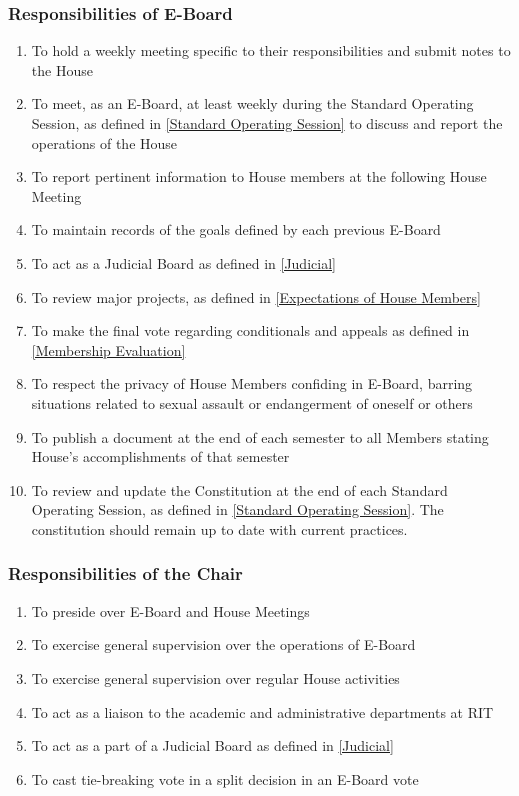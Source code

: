 \documentclass{article}
\newcommand{\asubsection}[1]{\subsubsection{#1} \label{#1}}
\begin{document}
\asubsection{Responsibilities of E-Board}
\begin{enumerate}
	\item To hold a weekly meeting specific to their responsibilities and submit notes to the House
	\item To meet, as an E-Board, at least weekly during the Standard Operating Session, as defined in \ref{Standard Operating Session} to discuss and report the operations of the House
	\item To report pertinent information to House members at the following House Meeting
	\item To maintain records of the goals defined by each previous E-Board
	\item To act as a Judicial Board as defined in \ref{Judicial}
	\item To review major projects, as defined in \ref{Expectations of House Members}
	\item To make the final vote regarding conditionals and appeals as defined in \ref{Membership Evaluation}
	\item To respect the privacy of House Members confiding in E-Board, barring situations related to sexual assault or endangerment of oneself or others
	\item To publish a document at the end of each semester to all Members stating House’s accomplishments of that semester
	\item To review and update the Constitution at the end of each Standard Operating Session, as defined in \ref{Standard Operating Session}.
		The constitution should remain up to date with current practices.
\end{enumerate}

\asubsection{Responsibilities of the Chair}
\begin{enumerate}
	\item To preside over E-Board and House Meetings
	\item To exercise general supervision over the operations of E-Board
	\item To exercise general supervision over regular House activities
	\item To act as a liaison to the academic and administrative departments at RIT
	\item To act as a part of a Judicial Board as defined in \ref{Judicial}
	\item To cast tie-breaking vote in a split decision in an E-Board vote
\end{enumerate}
\end{document}

